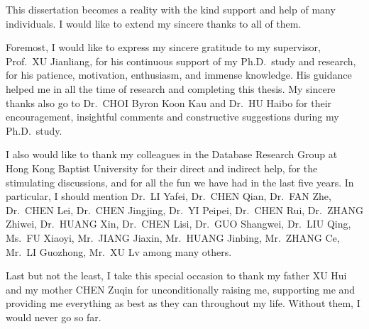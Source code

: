 \begin{acknowledgements}
This dissertation becomes a reality with the kind support and help of many individuals. I would like to extend my sincere thanks to all of them.

Foremost, I would like to express my sincere gratitude to my supervisor, Prof.\ XU Jianliang, for his continuous support of my Ph.D.\ study and research, for his patience, motivation, enthusiasm, and immense knowledge. His guidance helped me in all the time of research and completing this thesis. My sincere thanks also go to Dr.\ CHOI Byron Koon Kau and Dr.\ HU Haibo for their encouragement, insightful comments and constructive suggestions during my Ph.D.\ study.

I also would like to thank my colleagues in the Database Research Group at Hong Kong Baptist University for their direct and indirect help, for the stimulating discussions, and for all the fun we have had in the last five years. In particular, I should mention Dr.\ LI Yafei, Dr.\ CHEN Qian, Dr.\ FAN Zhe, Dr.\ CHEN Lei, Dr.\ CHEN Jingjing, Dr.\ YI Peipei, Dr.\ CHEN Rui, Dr.\ ZHANG Zhiwei, Dr.\ HUANG Xin, Dr.\ CHEN Lisi, Dr.\ GUO Shangwei, Dr.\ LIU Qing, Ms.\ FU Xiaoyi, Mr.\ JIANG Jiaxin, Mr.\ HUANG Jinbing, Mr.\ ZHANG Ce, Mr.\ LI Guozhong, Mr.\ XU Lv among many others.

Last but not the least, I take this special occasion to thank my father XU Hui and my mother CHEN Zuqin for unconditionally raising me, supporting me and providing me everything as best as they can throughout my life. Without them, I would never go so far.
\end{acknowledgements}

